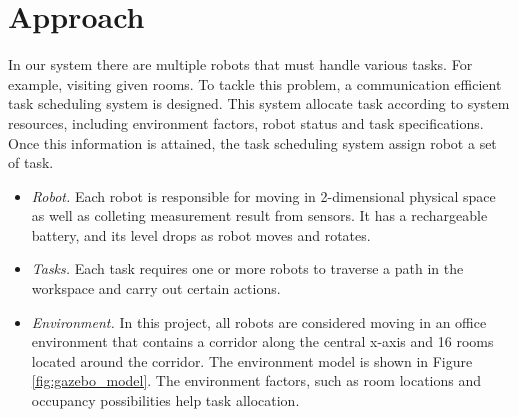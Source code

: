 \chapter{Approach}


In our system there are multiple robots that must handle various tasks. For example, visiting given rooms. To tackle this problem, a communication efficient task scheduling system is designed. 
This system allocate task according to system resources, including environment factors, robot status and task specifications. Once this information is attained, the task scheduling system assign robot a set of task.

\begin{itemize}
	\item \textsl{Robot.} Each robot is responsible for moving in 2-dimensional physical space as well as colleting measurement result from sensors. It has a rechargeable battery, and its level drops as robot moves and rotates.
	\item \textsl{Tasks.} Each task requires one or more robots to traverse a path in the workspace and carry out certain actions\cite{Ivan2017}.
	\item \textsl{Environment.} In this project, all robots are considered moving in an office environment that contains a corridor along the central x-axis and 16 rooms located around the corridor. The environment model is shown in Figure \ref{fig:gazebo_model}. The environment factors, such as room locations and occupancy possibilities help task allocation.
\end{itemize}

